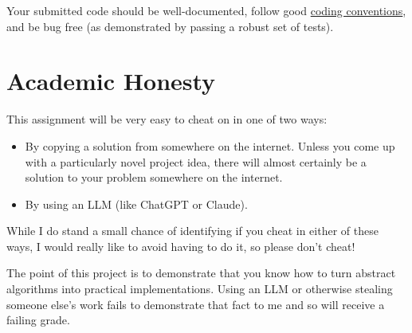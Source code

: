 \documentclass{article}
\begin{document}
Your submitted code should be well-documented, follow good \href{https://en.wikipedia.org/wiki/Coding_conventions}{coding conventions}, and be bug free (as demonstrated by passing a robust set of tests).

\section{Academic Honesty}
This assignment will be very easy to cheat on in one of two ways:
\begin{itemize}
	\item By copying a solution from somewhere on the internet. Unless you come up with a particularly novel project idea, there will almost certainly be a solution to your problem somewhere on the internet.
	\item By using an LLM (like ChatGPT or Claude).
\end{itemize}
While I do stand a small chance of identifying if you cheat in either of these ways, I would really like to avoid having to do it, so please don't cheat!

The point of this project is to demonstrate that you know how to turn abstract algorithms into practical implementations.
Using an LLM or otherwise stealing someone else's work fails to demonstrate that fact to me and so will receive a failing grade.
\end{document}
